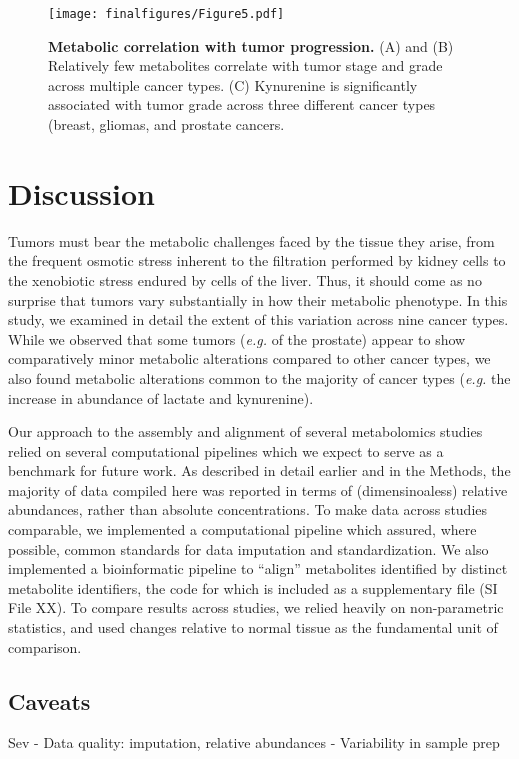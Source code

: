 \documentclass[10pt]{article}
\begin{document}
\begin{figure}[ht!]
  \centering
     \texttt{[image: finalfigures/Figure5.pdf]}
  \caption{\textbf{Metabolic correlation with tumor progression.} (A) and (B) Relatively few metabolites correlate with tumor stage and grade across multiple cancer types. (C) Kynurenine is significantly associated with tumor grade across three different cancer types (breast, gliomas, and  prostate cancers.}
     \label{fig:Fig5}
\end{figure}


\section{Discussion}

Tumors must bear the metabolic challenges faced by the tissue they arise, from the frequent osmotic stress inherent to the filtration performed by kidney cells to the xenobiotic stress endured by cells of the liver. Thus, it should come as no surprise that tumors  vary substantially in how their metabolic phenotype. In this study, we examined in detail the extent of this variation across nine cancer types. While we observed that some tumors (\textit{e.g.} of the prostate) appear to show comparatively minor metabolic alterations compared to other cancer types, we also found metabolic alterations common to the majority of cancer types (\textit{e.g.} the increase in abundance of lactate and kynurenine). 

Our approach to the assembly and alignment of several metabolomics studies relied on several computational pipelines which we expect to serve as a benchmark for future work. As described in detail earlier and in the Methods, the majority of data compiled here was reported in terms of (dimensinoaless) relative abundances, rather than absolute concentrations. To make data across studies comparable, we implemented a computational pipeline which assured, where possible, common standards for data imputation and standardization. We also implemented a bioinformatic pipeline to ``align'' metabolites identified by distinct metabolite identifiers, the code for which is included as a supplementary file (SI File XX). To compare results across studies, we relied heavily on non-parametric statistics, and used changes relative to normal tissue as the fundamental unit of comparison. 

\subsection{Caveats}
Sev
- Data quality: imputation, relative abundances
- Variability in sample prep
\end{document}
